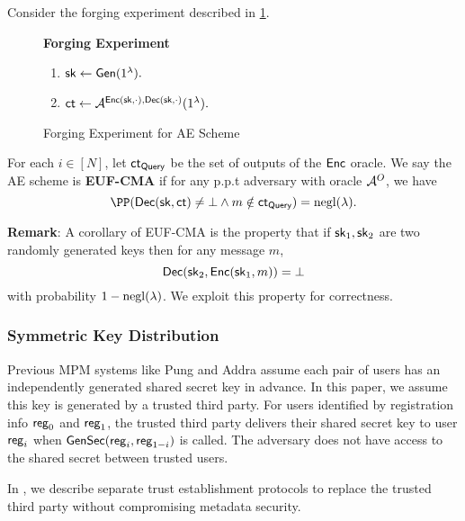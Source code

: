 \begin{definition}
\label{defn:AE-unforgability}
Consider the forging experiment described in \cref{expr:AE-forging}.

\begin{figure}[h!]
\begin{framed}
\textbf{Forging Experiment}
\begin{enumerate}
    \item ${\mathsf{sk}} \leftarrow \mathsf{Gen}(1^{\lambda}).$
    \item $\mathsf{ct} \leftarrow \mathcal{A}^{\mathsf{Enc}({\mathsf{sk}}, \cdot), \mathsf{Dec}({\mathsf{sk}}, \cdot)}(1^{\lambda}).$
\end{enumerate}
\end{framed}
\caption{Forging Experiment for AE Scheme}
\label{expr:AE-forging}
\end{figure}

For each $i \in [N]$, let $\mathsf{ct}_{\mathsf{Query}}$ be the set of outputs of the $\mathsf{Enc}$ oracle. We say the AE scheme is \textbf{EUF-CMA} if for any p.p.t adversary with oracle $\mathcal{A}^O$, we have
$$\PP(\dec(\sk, \ct) \neq \bot \land m \notin \ct_{\query}) = \negl(\lambda).$$
\end{definition}

\textbf{Remark}: A corollary of EUF-CMA is the property that if ${\mathsf{sk}}_1, {\mathsf{sk}}_2$ are two randomly generated keys then for any message $m$, 
$$\mathsf{Dec}({\mathsf{sk}}_2, \mathsf{Enc}({\mathsf{sk}}_1, m)) = \bot$$ 
with probability $1 - \operatorname{negl}(\lambda)$. We exploit this property for correctness.

\subsubsection{Symmetric Key Distribution}
Previous MPM systems like Pung and Addra assume each pair of users has an independently generated shared secret key in advance. In this paper, we assume this key is generated by a trusted third party. For users identified by registration info $\mathsf{reg}_0$ and $\mathsf{reg}_1$, the trusted third party delivers their shared secret key to user $\mathsf{reg}_i$ when $\mathsf{GenSec}(\mathsf{reg}_i, \mathsf{reg}_{1 - i})$ is called. The adversary does not have access to the shared secret between trusted users.

In \cite[Section 4]{whitepaper}, we describe separate trust establishment protocols to replace the trusted third party without compromising metadata security. 
